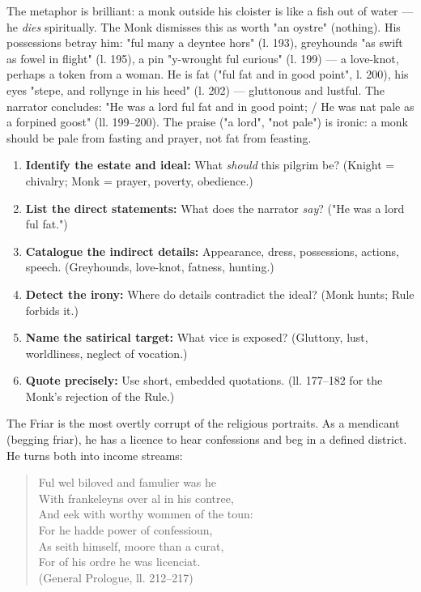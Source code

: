 \documentclass[11pt]{article}
\newcommand{\cle}[1]{{\popxbold\color{popdark}#1}}
\newcounter{popsec}
\newcounter{popsub}
\newcommand{\courssub}[1]{%
  \stepcounter{popsub}%
  \par\vspace{9pt}\noindent{\popxbold\fontsize{11.5}{13}\selectfont\color{popink}{\color{poporange}\thepopsec.\thepopsub}\hspace{6pt}#1}\par\nopagebreak\vspace{4pt}
}
\begin{document}
The metaphor is brilliant: a monk outside his cloister is like a fish out of water — he \emph{dies} spiritually. The Monk dismisses this as worth "an oystre" (nothing). His \cle{possessions} betray him: "ful many a deyntee hors" (l. 193), greyhounds "as swift as fowel in flight" (l. 195), a pin "y-wrought ful curious" (l. 199) — a love-knot, perhaps a token from a woman. He is fat ("ful fat and in good point", l. 200), his eyes "stepe, and rollynge in his heed" (l. 202) — gluttonous and lustful. The narrator concludes: "He was a lord ful fat and in good point; / He was nat pale as a forpined goost" (ll. 199–200). The praise ("a lord", "not pale") is \cle{ironic}: a monk should be pale from fasting and prayer, not fat from feasting.

\begin{methode}
\begin{enumerate}
\item \textbf{Identify the estate and ideal:} What \emph{should} this pilgrim be? (Knight = chivalry; Monk = prayer, poverty, obedience.)
\item \textbf{List the direct statements:} What does the narrator \emph{say}? ("He was a lord ful fat.")
\item \textbf{Catalogue the indirect details:} Appearance, dress, possessions, actions, speech. (Greyhounds, love-knot, fatness, hunting.)
\item \textbf{Detect the irony:} Where do details contradict the ideal? (Monk hunts; Rule forbids it.)
\item \textbf{Name the satirical target:} What vice is exposed? (Gluttony, lust, worldliness, neglect of vocation.)
\item \textbf{Quote precisely:} Use short, embedded quotations. (ll. 177–182 for the Monk's rejection of the Rule.)
\end{enumerate}
\end{methode}

\courssub{The Friar (Hubert)}

The Friar is the most \cle{overtly corrupt} of the religious portraits. As a \cle{mendicant} (begging friar), he has a licence to hear confessions and beg in a defined district. He turns both into \cle{income streams}:

\begin{quote}
Ful wel biloved and famulier was he \\
With frankeleyns over al in his contree, \\
And eek with worthy wommen of the toun: \\
For he hadde power of confessioun, \\
As seith himself, moore than a curat, \\
For of his ordre he was licenciat. \\
(General Prologue, ll. 212–217)
\end{quote}
\end{document}
